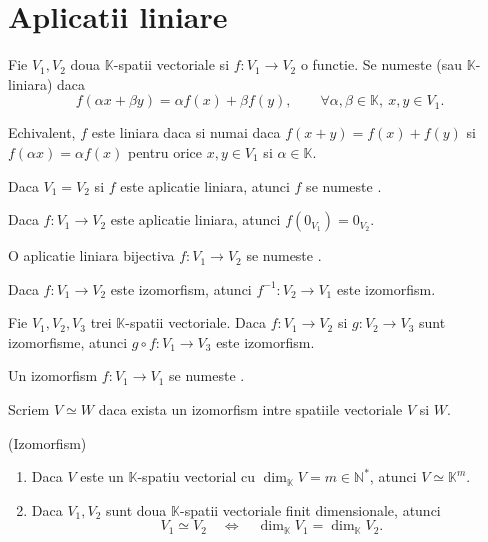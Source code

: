\documentclass{article}
\begin{document}
\section{Aplicatii liniare}
\begin{enumerate}

   Fie $V_1, V_2$ doua $\mathbb{K}$-spatii vectoriale si $f : V_1 \to V_2$ o functie. Se numeste  (sau $\mathbb{K}$-liniara) daca
  \[
    f(\alpha x + \beta y) = \alpha f(x) + \beta f(y),
    \qquad \forall \alpha, \beta \in \mathbb{K},\ x, y \in V_1.
  \]

  \proprietate Echivalent, $f$ este liniara daca si numai daca $f(x+y)=f(x)+f(y)$ si $f(\alpha x)=\alpha f(x)$ pentru orice $x,y\in V_1$ si $\alpha\in\mathbb K$.

  \observatie Daca $V_1 = V_2$ si $f$ este aplicatie liniara, atunci $f$ se numeste .

  \observatie Daca $f : V_1 \to V_2$ este aplicatie liniara, atunci $f(0_{V_1}) = 0_{V_2}$.

   O aplicatie liniara bijectiva $f : V_1 \to V_2$ se numeste .

  \proprietate Daca $f : V_1 \to V_2$ este izomorfism, atunci $f^{-1} : V_2 \to V_1$ este izomorfism.

  \proprietate Fie $V_1, V_2, V_3$ trei $\mathbb{K}$-spatii vectoriale. Daca $f : V_1 \to V_2$ si $g : V_2 \to V_3$ sunt izomorfisme, atunci $g \circ f : V_1 \to V_3$ este izomorfism.

  \observatie Un izomorfism $f : V_1 \to V_1$ se numeste .

  \notatie Scriem $V \simeq W$ daca exista un izomorfism intre spatiile vectoriale $V$ si $W$.

  \begin{tcolorbox}
    \teorema (Izomorfism)
    \begin{enumerate}
      \item Daca $V$ este un $\mathbb{K}$-spatiu vectorial cu $\dim_{\mathbb{K}} V = m \in \mathbb{N}^*$, atunci $V \simeq \mathbb{K}^m$.
      \item Daca $V_1, V_2$ sunt doua $\mathbb{K}$-spatii vectoriale finit dimensionale, atunci
      \[
        V_1 \simeq V_2 \quad\Leftrightarrow\quad
        \dim_{\mathbb{K}} V_1 = \dim_{\mathbb{K}} V_2.
      \]
    \end{enumerate}
  \end{tcolorbox}


\end{enumerate}
\end{document}
